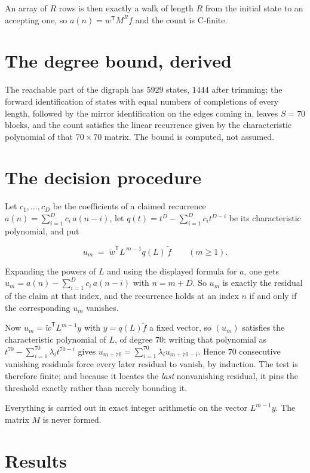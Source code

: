 \documentclass[11pt]{article}
\theoremstyle{definition}
\begin{document}
An array of $R$ rows is then exactly a walk of length $R$ from the initial state to an accepting one, so $a(n) = w^{\mathsf T}M^{R}f$ and the count is C-finite.

\section{The degree bound, derived}

The reachable part of the digraph has $5929$ states, $1444$ after trimming; the forward identification of states with equal numbers of completions of every length, followed by the mirror identification on the edges coming in, leaves $S = 70$ blocks, and the count satisfies the linear recurrence given by the characteristic polynomial of that $70\times70$ matrix. The bound is computed, not assumed.

\section{The decision procedure}

Let $c_1,\dots,c_D$ be the coefficients of a claimed recurrence $a(n) = \sum_{i=1}^{D} c_i\,a(n-i)$, let $q(t) = t^{D} - \sum_{i=1}^{D} c_i t^{D-i}$ be its characteristic polynomial, and put

\[u_m \;=\; \tilde w^{\mathsf T} L^{\,m-1} q(L)\,\tilde f \qquad (m \ge 1).\]

Expanding the powers of $L$ and using the displayed formula for $a$, one gets $u_m = a(n) - \sum_{i=1}^{D} c_i\,a(n-i)$ with $n = m + D$. So $u_m$ is exactly the residual of the claim at that index, and the recurrence holds at an index $n$ if and only if the corresponding $u_m$ vanishes.

Now $u_m = \tilde w^{\mathsf T} L^{m-1} y$ with $y = q(L)\tilde f$ a fixed vector, so $(u_m)$ satisfies the characteristic polynomial of $L$, of degree $70$: writing that polynomial as $t^{70} - \sum_{i=1}^{70} \lambda_i t^{70-i}$ gives $u_{m+70} = \sum_{i=1}^{70} \lambda_i u_{m+70-i}$. Hence $70$ consecutive vanishing residuals force every later residual to vanish, by induction. The test is therefore finite; and because it locates the {\itshape last} nonvanishing residual, it pins the threshold exactly rather than merely bounding it.

Everything is carried out in exact integer arithmetic on the vector $L^{m-1}y$. The matrix $M$ is never formed.

\section{Results}
\end{document}
